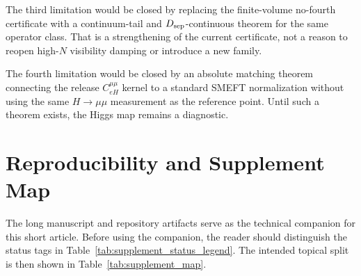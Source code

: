 \documentclass[pdflatex,sn-mathphys-num,iicol]{sn-jnl}
\begin{document}
The third limitation would be closed by replacing the finite-volume no-fourth certificate with a continuum-tail and \(D_{\rm sep}\)-continuous theorem for the same operator class.
That is a strengthening of the current certificate, not a reason to reopen high-\(N\) visibility damping or introduce a new family.

The fourth limitation would be closed by an absolute matching theorem connecting the release \(C_{eH}^{\mu\mu}\) kernel to a standard SMEFT normalization without using the same \(H\to\mu\mu\) measurement as the reference point.
Until such a theorem exists, the Higgs map remains a diagnostic.

\section{Reproducibility and Supplement Map}
\label{sec:repro}

The long manuscript and repository artifacts serve as the technical companion for this short article.
Before using the companion, the reader should distinguish the status tags in Table~\ref{tab:supplement_status_legend}.
The intended topical split is then shown in Table~\ref{tab:supplement_map}.
\end{document}
